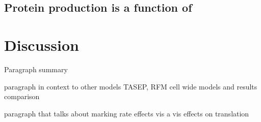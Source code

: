 \documentclass[review]{elsarticle}
\begin{document}
%
%
%
%
%



\subsection{Protein production is a function of}









\section{Discussion}

Paragraph summary

paragraph in context to other models TASEP, RFM cell wide models and results comparison

paragraph that talks about marking rate effects vis a vis effects on translation
\end{document}
